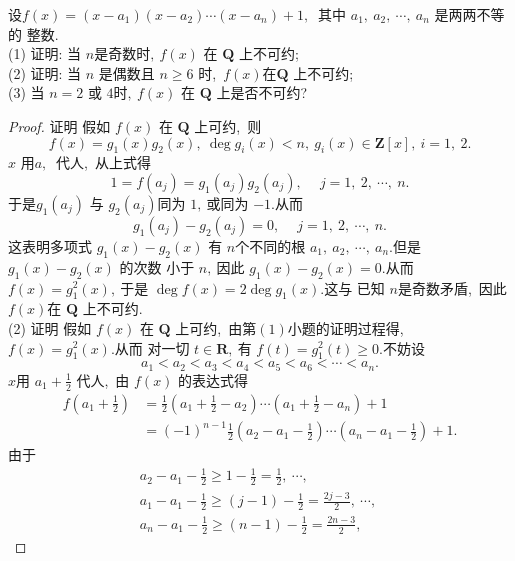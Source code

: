 \newpage
\begin{problem}
	设$  f(x)=\left(x-a_{1}\right)\left(x-a_{2}\right) \cdots\left(x-a_{n}\right)+1 ,\ $ 其中  $a_{1},\  a_{2},\  \cdots,\  a_{n} $ 是两两不等的 整数.\\
	(1) 证明: 当 $ n  $是奇数时$,\   f(x) $ 在 $ \mathbf{Q} $ 上不可约;\\
	(2) 证明: 当  $n$  是偶数且 $ n \geqslant 6$  时,\  $ f(x)  在  \mathbf{Q} $ 上不可约;\\
	(3) 当 $ n=2 $ 或 $4 $时$,\   f(x) $ 在 $ \mathbf{Q} $ 上是否不可约?
\end{problem}
\begin{proof}
	证明 假如 $ f(x) $ 在  $\mathbf{Q} $ 上可约,\  则
	$$f(x)=g_{1}(x) g_{2}(x),\  \operatorname{deg} g_{i}(x)<n,\  g_{i}(x) \in \mathbf{Z}[x],\  i=1,\ 2 .$$
	$x $ 用$  a ,\ $ 代人,\ 从上式得
	$$1=f\left(a_{j}\right)=g_{1}\left(a_{j}\right) g_{2}\left(a_{j}\right),\  \quad j=1,\ 2,\  \cdots,\  n .$$
	于是$  g_{1}\left(a_{j}\right) $ 与 $ g_{2}\left(a_{j}\right)  $同为 $1 ,\  $或同为 $ -1  .$从而
	$$g_{1}\left(a_{j}\right)-g_{2}\left(a_{j}\right)=0,\  \quad j=1,\ 2,\  \cdots,\  n .$$
	这表明多项式 $ g_{1}(x)-g_{2}(x) $ 有 $ n  $个不同的根 $ a_{1},\  a_{2},\  \cdots,\  a_{n}  .$但是 $ g_{1}(x)-g_{2}(x) $ 的次数 小于 $ n ,\  $因此 $ g_{1}(x)-g_{2}(x)=0  .$从而 $ f(x)=g_{1}^{2}(x) ,\  $于是 $ \operatorname{deg} f(x)=2 \operatorname{deg} g_{1}(x)  .$这与 已知  $n  $是奇数矛盾,\  因此$  f(x)  $在 $ \mathbf{Q} $ 上不可约.\\
	(2) 证明 假如 $ f(x) $ 在  $\mathbf{Q} $ 上可约,\  由第$ (1) $小题的证明过程得,\ $  f(x)=g_{1}^{2}(x)  .$从而 对一切  $t \in \mathbf{R} ,\  $有 $ f(t)=g_{1}^{2}(t) \geqslant 0  .$不妨设
	$$a_{1}<a_{2}<a_{3}<a_{4}<a_{5}<a_{6}<\cdots<a_{n} .$$
	$x  $用  $a_{1}+\frac{1}{2}$  代人,\  由 $ f(x) $ 的表达式得
	$$\begin{aligned}
		f\left(a_{1}+\frac{1}{2}\right) & =\frac{1}{2}\left(a_{1}+\frac{1}{2}-a_{2}\right) \cdots\left(a_{1}+\frac{1}{2}-a_{n}\right)+1 \\
		& =(-1)^{n-1} \frac{1}{2}\left(a_{2}-a_{1}-\frac{1}{2}\right) \cdots\left(a_{n}-a_{1}-\frac{1}{2}\right)+1 .
	\end{aligned}$$
	由于
	$$\begin{array}{c}
		a_{2}-a_{1}-\frac{1}{2} \geqslant 1-\frac{1}{2}=\frac{1}{2},\  \cdots,\  \\
		a_{1}-a_{1}-\frac{1}{2} \geqslant(j-1)-\frac{1}{2}=\frac{2 j-3}{2},\  \cdots,\  \\
		a_{n}-a_{1}-\frac{1}{2} \geqslant(n-1)-\frac{1}{2}=\frac{2 n-3}{2},\ 

\end{array}$$
\end{proof}
